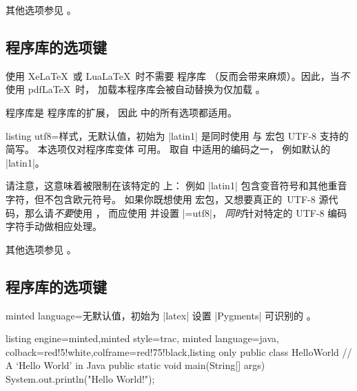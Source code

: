 其他选项参见 。


\clearpage
\subsection{ 程序库的选项键}
\begin{marker}
使用 Xe\LaTeX\ 或 Lua\LaTeX\ 时不需要  程序库
（反而会带来麻烦）。因此，当\emph{不}使用 pdf\LaTeX\ 时，
加载本程序库会被自动替换为仅加载 。
\end{marker}

 程序库是  程序库的扩展，
因此  中的所有选项都适用。

\begin{docTcbKey}{listing utf8}{=}{样式，无默认值，初始为 |latin1|}
  是同时使用 
  与  \cite{oberdiek:listingsutf8} 宏包 UTF-8 支持的简写。
  本选项仅对程序库变体  可用。
   取自 \cite{oberdiek:listingsutf8} 中适用的编码之一，
  例如默认的 |latin1|。\par
  请注意，这意味着被限制在该特定的  上：
  例如 |latin1| 包含变音符号和其他重音字符，但不包含欧元符号。
  如果你既想使用  宏包，又想要\flqq 真正的\frqq\
  UTF-8 源代码，那么请\emph{不要}使用 ，
  而应使用  并设置
  |=utf8|，
  \emph{同时}针对特定的 UTF-8 编码字符手动做相应处理。

\end{docTcbKey}

其他选项参见 。

\clearpage
\subsection{ 程序库的选项键}

\begin{docTcbKey}{minted language}{=}{无默认值，初始为 |latex|}
设置 |Pygments| \cite{pygments:web} 可识别的 \meta{programming language}。
\begin{dispExample}
\begin{tcblisting}{listing engine=minted,minted style=trac,
  minted language=java,
  colback=red!5!white,colframe=red!75!black,listing only}
    public class HelloWorld {
      // A `Hello World' in Java
      public static void main(String[] args) {
        System.out.println("Hello World!");
      }
    }
\end{tcblisting}
\end{dispExample}
\end{docTcbKey}


